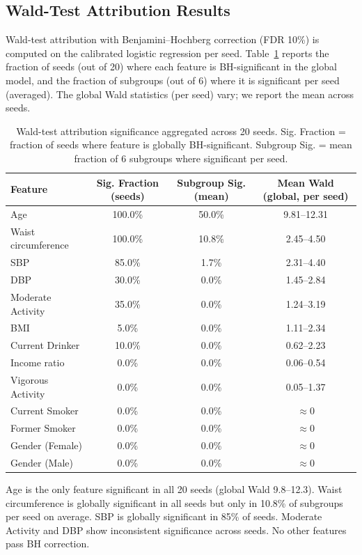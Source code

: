 \documentclass[11pt,a4paper]{article}
\theoremstyle{plain}
\begin{document}
\subsection{Wald-Test Attribution Results}

Wald-test attribution with Benjamini--Hochberg correction (FDR 10\%) is computed on the calibrated logistic regression per seed. Table~\ref{tab:attribution} reports the fraction of seeds (out of 20) where each feature is BH-significant in the global model, and the fraction of subgroups (out of 6) where it is significant per seed (averaged). The global Wald statistics (per seed) vary; we report the mean across seeds.

\begin{table}[htbp]
\centering
\caption{Wald-test attribution significance aggregated across 20 seeds. Sig. Fraction = fraction of seeds where feature is globally BH-significant. Subgroup Sig. = mean fraction of 6 subgroups where significant per seed.}
\label{tab:attribution}
\begin{tabular}{lccc}
\toprule
Feature & Sig. Fraction (seeds) & Subgroup Sig. (mean) & Mean Wald (global, per seed) \\
\midrule
Age & 100.0\% & 50.0\% & 9.81--12.31 \\
Waist circumference & 100.0\% & 10.8\% & 2.45--4.50 \\
SBP & 85.0\% & 1.7\% & 2.31--4.40 \\
DBP & 30.0\% & 0.0\% & 1.45--2.84 \\
Moderate Activity & 35.0\% & 0.0\% & 1.24--3.19 \\
BMI & 5.0\% & 0.0\% & 1.11--2.34 \\
Current Drinker & 10.0\% & 0.0\% & 0.62--2.23 \\
Income ratio & 0.0\% & 0.0\% & 0.06--0.54 \\
Vigorous Activity & 0.0\% & 0.0\% & 0.05--1.37 \\
Current Smoker & 0.0\% & 0.0\% & $\approx$0 \\
Former Smoker & 0.0\% & 0.0\% & $\approx$0 \\
Gender (Female) & 0.0\% & 0.0\% & $\approx$0 \\
Gender (Male) & 0.0\% & 0.0\% & $\approx$0 \\
\bottomrule
\end{tabular}
\end{table}

Age is the only feature significant in all 20 seeds (global Wald 9.8--12.3). Waist circumference is globally significant in all seeds but only in 10.8\% of subgroups per seed on average. SBP is globally significant in 85\% of seeds. Moderate Activity and DBP show inconsistent significance across seeds. No other features pass BH correction.
\end{document}
